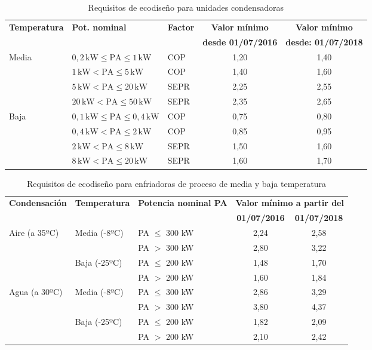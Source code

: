 \begin{table}[H]
	\centering
	\caption{Requisitos de ecodiseño para unidades condensadoras}\cite{intarcon-2023}
	\begin{tabular}{lllcc}
		\toprule
		\textbf{Temperatura} & \textbf{Pot. nominal} & \textbf{Factor} & \textbf{Valor mínimo }  & \textbf{Valor mínimo } \\
		
		 & & & \textbf{desde 01/07/2016} & \textbf{desde: 01/07/2018} \\
		
		\midrule
		Media & $0,2 \, \text{kW} \leq \text{PA} \leq 1 \, \text{kW}$ & COP & 1,20 & 1,40 \\
		& $1 \, \text{kW} < \text{PA} \leq 5 \, \text{kW}$ & COP & 1,40 & 1,60 \\
		& $5 \, \text{kW} < \text{PA} \leq 20 \, \text{kW}$ & SEPR & 2,25 & 2,55 \\
		& $20 \, \text{kW} < \text{PA} \leq 50 \, \text{kW}$ & SEPR & 2,35 & 2,65 \\
		\midrule
		Baja & $0,1 \, \text{kW} \leq \text{PA} \leq 0,4 \, \text{kW}$ & COP & 0,75 & 0,80 \\
		& $0,4 \, \text{kW} < \text{PA} \leq 2 \, \text{kW}$ & COP & 0,85 & 0,95 \\
		& $2 \, \text{kW} < \text{PA} \leq 8 \, \text{kW}$ & SEPR & 1,50 & 1,60 \\
		& $8 \, \text{kW} < \text{PA} \leq 20 \, \text{kW}$ & SEPR & 1,60 & 1,70 \\
		\bottomrule
	\end{tabular}
	\label{tabla:condensadores}
\end{table}


\begin{table}[htbp]
	\centering
	\caption{Requisitos de ecodiseño para enfriadoras de proceso de media y baja temperatura}\rsp 
	\cite{intarcon-2023}
	\begin{tabular}{lllcc}
		\toprule
		\textbf{Condensación} & \textbf{Temperatura} & \textbf{Potencia nominal PA} & \multicolumn{2}{c}{\textbf{Valor mínimo a partir del}} \\
		& & & \textbf{01/07/2016} & \textbf{01/07/2018} \\
		\midrule
		Aire (a 35ºC) & Media (-8ºC) & PA $\leq$ 300 kW & 2,24 & 2,58 \\
		& & PA $>$ 300 kW & 2,80 & 3,22 \\
		&Baja (-25ºC) & PA $\leq$ 200 kW & 1,48 & 1,70 \\
		& & PA $>$ 200 kW & 1,60 & 1,84 \\
		Agua (a 30ºC) & Media (-8ºC) & PA $\leq$ 300 kW & 2,86 & 3,29 \\
		& & PA $>$ 300 kW & 3,80 & 4,37 \\
		&Baja (-25ºC) & PA $\leq$ 200 kW & 1,82 & 2,09 \\
		& & PA $>$ 200 kW & 2,10 & 2,42 \\
		\bottomrule
	\end{tabular}
	\label{tabla:enfriadores-med-baj}
\end{table}

